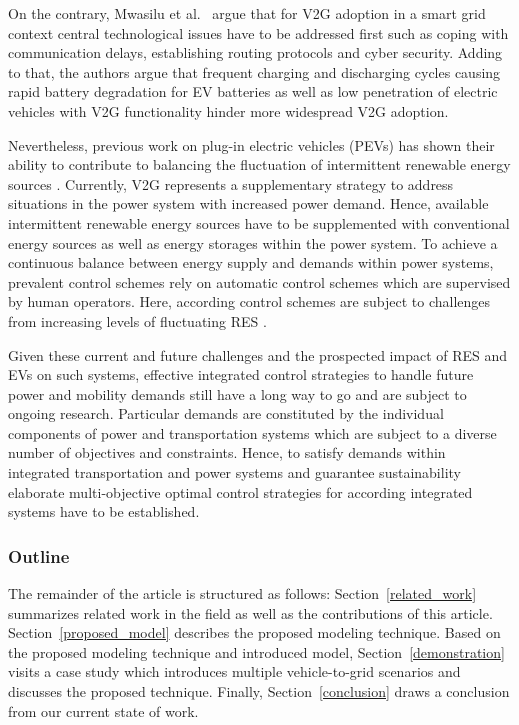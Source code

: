 On the contrary, Mwasilu et al.~\cite{mwasilu2014electric} argue that for V2G adoption in a smart grid context central technological issues have to be addressed first such as coping with communication delays, establishing routing protocols and cyber security. Adding to that, the authors argue that frequent charging and discharging cycles causing rapid battery degradation for EV batteries as well as low penetration of electric vehicles with V2G functionality hinder more widespread V2G adoption.

Nevertheless, previous work on plug-in electric vehicles (PEVs) has shown their ability to contribute to balancing the fluctuation of intermittent renewable energy sources \cite{dallinger2012grid}. Currently, V2G represents a supplementary strategy to address situations in the power system with increased power demand. Hence, available intermittent renewable energy sources have to be supplemented with conventional energy sources as well as energy storages within the power system. To achieve a continuous balance between energy supply and demands within power systems, prevalent control schemes rely on automatic control schemes which are supervised by human operators. Here, according control schemes are subject to challenges from increasing levels of fluctuating RES \cite{heussen2012unified}.

Given these current and future challenges and the prospected impact of RES and EVs on such systems, effective integrated control strategies to handle future power and mobility demands still have a long way to go and are subject to ongoing research. Particular demands are constituted by the individual components of power and transportation systems which are subject to a diverse number of objectives and constraints. Hence, to satisfy demands within integrated transportation and power systems and guarantee sustainability elaborate multi-objective optimal control strategies for according integrated systems have to be established.

\subsubsection*{Outline}

The remainder of the article is structured as follows: Section~\ref{related_work} summarizes related work in the field as well as the contributions of this article. Section~\ref{proposed_model} describes the proposed modeling technique. Based on the proposed modeling technique and introduced model, Section~\ref{demonstration} visits a case study which introduces multiple vehicle-to-grid scenarios and discusses the proposed technique. Finally, Section~\ref{conclusion} draws a conclusion from our current state of work.
